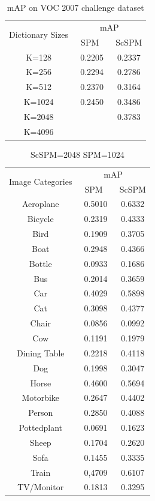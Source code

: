 \documentclass[conference]{IEEEtran}
\begin{document}
\begin{table}[ph]
  \centering
  \begin{tabular}{|c|c|c|}
    \hline
    \multirow{2}{*}{Dictionary Sizes} & \multicolumn{2}{c|}{mAP} \\
    \cline{2-3}
    & \ SPM\ \ & ScSPM \\
    \hline
     K=128 & 0.2205 & 0.2337 \\
    \hline
     K=256 & 0.2294 & 0.2786 \\
     \hline
     K=512 & 0.2370 & 0.3164 \\
     \hline
     K=1024 & 0.2450 & 0.3486 \\
     \hline
     K=2048 & & 0.3783 \\
     \hline
     K=4096 & & \\
    \hline
  \end{tabular}
  \caption{ mAP on VOC 2007 challenge dataset }
  \label{tablo}
\end{table}

\begin{table}[ph]
  \centering
  \begin{tabular}{|c|c|c|}
    \hline
    \multirow{2}{*}{Image Categories} & \multicolumn{2}{c|}{mAP} \\
    \cline{2-3}
               & \ SPM\ \ & ScSPM \\
    \hline
     Aeroplane & 0.5010 & 0.6332 \\
    \hline
     Bicycle & 0.2319 & 0.4333 \\
     \hline
     Bird & 0.1909 & 0.3705 \\
     \hline
     Boat & 0.2948 & 0.4366 \\
     \hline
     Bottle & 0.0933 & 0.1686 \\
     \hline
     Bus & 0.2014 & 0.3659 \\
     \hline
     Car & 0.4029 & 0.5898 \\
     \hline
     Cat & 0.3098 & 0.4377 \\
     \hline
     Chair & 0.0856 & 0.0992 \\
     \hline
     Cow & 0.1191 & 0.1979 \\
     \hline
     Dining Table & 0.2218 & 0.4118 \\
     \hline
     Dog & 0.1998 & 0.3047 \\
     \hline
     Horse & 0.4600 & 0.5694 \\
     \hline
     Motorbike & 0.2647 & 0.4402 \\
     \hline
     Person & 0.2850 & 0.4088 \\
    \hline
     Pottedplant & 0.0691 & 0.1623 \\
     \hline
     Sheep & 0.1704 & 0.2620 \\
     \hline
     Sofa & 0.1455 & 0.3335 \\
     \hline
     Train & 0,4709 & 0.6107 \\
     \hline
     TV/Monitor & 0.1813 & 0.3295 \\
     \hline
  \end{tabular}
  \caption{ ScSPM=2048 SPM=1024 }
  \label{tablo}
\end{table}







\end{document}
